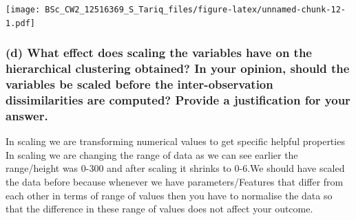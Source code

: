 \documentclass[]{article}
\begin{document}
\texttt{[image: BSc\_CW2\_12516369\_S\_Tariq\_files/figure-latex/unnamed-chunk-12-1.pdf]}

\hypertarget{d-what-effect-does-scaling-the-variables-have-on-the-hierarchical-clustering-obtained-in-your-opinion-should-the-variables-be-scaled-before-the-inter-observation-dissimilarities-are-computed-provide-a-justification-for-your-answer.}{%
\subsubsection{(d) What effect does scaling the variables have on the
hierarchical clustering obtained? In your opinion, should the variables
be scaled before the inter-observation dissimilarities are computed?
Provide a justification for your
answer.}\label{d-what-effect-does-scaling-the-variables-have-on-the-hierarchical-clustering-obtained-in-your-opinion-should-the-variables-be-scaled-before-the-inter-observation-dissimilarities-are-computed-provide-a-justification-for-your-answer.}}

In scaling we are transforming numerical values to get specific helpful
properties In scaling we are changing the range of data as we can see
earlier the range/height was 0-300 and after scaling it shrinks to
0-6.We should have scaled the data before because whenever we have
parameters/Features that differ from each other in terms of range of
values then you have to normalise the data so that the difference in
these range of values does not affect your outcome.
\end{document}
